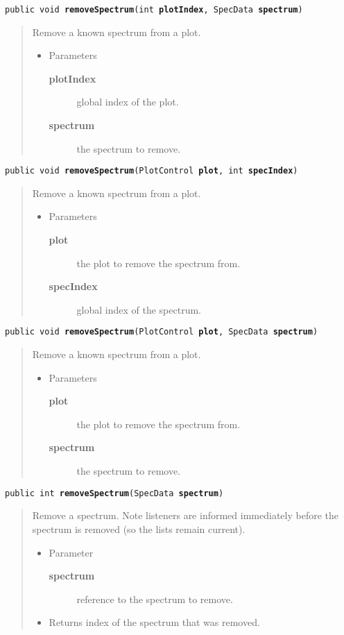 \documentclass[twoside,11pt,nolof]{starlink}
\providecommand{\method}[1]{\texttt{#1}}
\newenvironment{desc}{\begin{quote}}{\end{quote}}
\begin{document}
\method{public void \textbf{removeSpectrum}(\texttt{int} \textbf{plotIndex}, \texttt{SpecData} \textbf{spectrum})\label{l315}\label{l316}}
\begin{desc}Remove a known spectrum from a plot.
\begin{itemize}
\item{Parameters
  \begin{description}
   \item[\textbf{plotIndex}]{global index of the plot.}
   \item[\textbf{spectrum}]{the spectrum to remove.}
  \end{description}}
\end{itemize}
\end{desc}

\method{public void \textbf{removeSpectrum}(\texttt{PlotControl} \textbf{plot}, \texttt{int} \textbf{specIndex})\label{l317}\label{l318}}
\begin{desc}Remove a known spectrum from a plot.
\begin{itemize}
\item{Parameters
  \begin{description}
   \item[\textbf{plot}]{the plot to remove the spectrum from.}
   \item[\textbf{specIndex}]{global index of the spectrum.}
  \end{description}}
\end{itemize}
\end{desc}

\method{public void \textbf{removeSpectrum}(\texttt{PlotControl} \textbf{plot}, \texttt{SpecData} \textbf{spectrum})\label{l319}\label{l320}}
\begin{desc}Remove a known spectrum from a plot.
\begin{itemize}
\item{Parameters
  \begin{description}
   \item[\textbf{plot}]{the plot to remove the spectrum from.}
   \item[\textbf{spectrum}]{the spectrum to remove.}
  \end{description}}
\end{itemize}
\end{desc}

\method{public int \textbf{removeSpectrum}(\texttt{SpecData} \textbf{spectrum})\label{l321}\label{l322}}
\begin{desc}Remove a spectrum. Note listeners are informed immediately
  before the spectrum is removed (so the lists remain current).
\begin{itemize}
\item{Parameter
  \begin{description}
   \item[\textbf{spectrum}]{reference to the spectrum to remove.}
  \end{description}}
\end{itemize}
\begin{itemize}
\item{Returns index of the spectrum that was removed. }
\end{itemize}
\end{desc}
\end{document}

